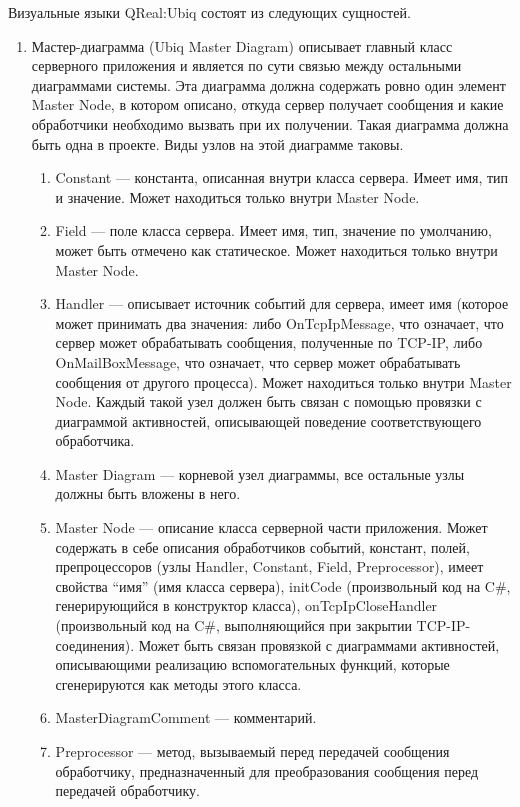 Визуальные языки QReal:Ubiq состоят из следующих сущностей.
\begin{enumerate}
	\item Мастер-диаграмма (Ubiq Master Diagram) описывает главный класс серверного 
		приложения и является по сути связью между остальными диаграммами системы. Эта 
		диаграмма должна содержать ровно один элемент Master Node, в котором описано, 
		откуда сервер получает сообщения и какие обработчики необходимо вызвать при их 
		получении. Такая диаграмма должна быть одна в проекте. Виды узлов на этой диаграмме таковы.
		\begin{enumerate}
			\item Constant --- константа, описанная внутри класса сервера. Имеет имя, тип 
				и значение. Может находиться только внутри Master Node.
			\item Field --- поле класса сервера. Имеет имя, тип, значение по умолчанию, 
				может быть отмечено как статическое. Может находиться только внутри Master Node.
			\item Handler --- описывает источник событий для сервера, имеет имя (которое 
				может принимать два значения: либо OnTcpIpMessage, что означает, что сервер 
				может обрабатывать сообщения, полученные по TCP-IP, либо OnMailBoxMessage, 
				что означает, что сервер может обрабатывать сообщения от другого процесса). 
				Может находиться только внутри Master Node. Каждый такой узел должен быть 
				связан с помощью провязки с диаграммой активностей, описывающей поведение 
				соответствующего обработчика.
			\item Master Diagram --- корневой узел диаграммы, все остальные узлы должны 
				быть вложены в него.
			\item Master Node --- описание класса серверной части приложения. Может содержать 
				в себе описания обработчиков событий, констант, полей, препроцессоров (узлы 
				Handler, Constant, Field, Preprocessor), имеет свойства "`имя"' (имя класса 
				сервера), initCode (произвольный код на C\#, генерирующийся в конструктор класса), 
				onTcpIpCloseHandler (произвольный код на C\#, выполняющийся при закрытии TCP-IP-соединения). 
				Может быть связан провязкой с диаграммами активностей, описывающими реализацию 
				вспомогательных функций, которые сгенерируются как методы этого класса.
			\item MasterDiagramComment --- комментарий.
			\item Preprocessor --- метод, вызываемый перед передачей сообщения обработчику, 
				предназначенный для преобразования сообщения перед передачей обработчику. 

\end{enumerate}
\end{enumerate}
